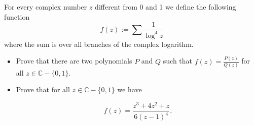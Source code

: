 For every complex number \(z\) different from 0 and 1 we define the following function
\[  f(z) := \sum \frac 1 {  \log^4 z } \]
where the sum is over all branches of the complex logarithm.
\begin{itemize}

\item[(a)] Prove that there are two polynomials \(P\) and \(Q\) such that \(f(z) = \displaystyle \frac {P(z)}{Q(z)} \) for all \(z\in\mathbb{C}-\{0,1\}\).

\item[(b)] Prove that for all \(z\in \mathbb{C}-\{0,1\}\) we have

\[ f(z) = \frac { z^3+4z^2+z}{6(z-1)^4}. \]
\end{itemize}
